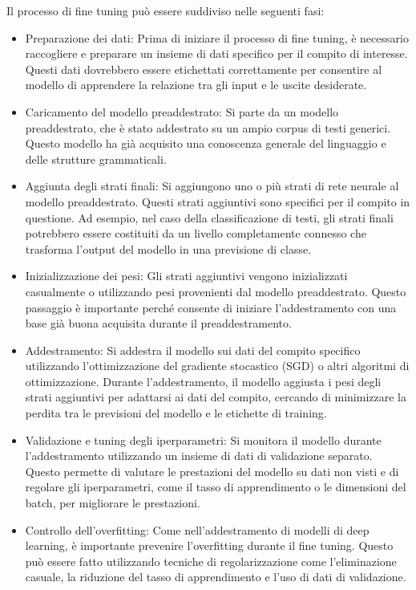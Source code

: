 Il processo di fine tuning può essere suddiviso nelle seguenti fasi:
\begin{itemize}
    \item Preparazione dei dati: Prima di iniziare il processo di fine tuning, è necessario raccogliere e preparare un insieme di dati specifico per il compito di interesse. Questi dati dovrebbero essere etichettati correttamente per consentire al modello di apprendere la relazione tra gli input e le uscite desiderate.
    \item Caricamento del modello preaddestrato: Si parte da un modello preaddestrato, che è stato addestrato su un ampio corpus di testi generici. Questo modello ha già acquisito una conoscenza generale del linguaggio e delle strutture grammaticali.
    \item Aggiunta degli strati finali: Si aggiungono uno o più strati di rete neurale al modello preaddestrato. Questi strati aggiuntivi sono specifici per il compito in questione. Ad esempio, nel caso della classificazione di testi, gli strati finali potrebbero essere costituiti da un livello completamente connesso che trasforma l'output del modello in una previsione di classe.
    \item Inizializzazione dei pesi: Gli strati aggiuntivi vengono inizializzati casualmente o utilizzando pesi provenienti dal modello preaddestrato. Questo passaggio è importante perché consente di iniziare l'addestramento con una base già buona acquisita durante il preaddestramento.
    \item Addestramento: Si addestra il modello sui dati del compito specifico utilizzando l'ottimizzazione del gradiente stocastico (SGD) o altri algoritmi di ottimizzazione. Durante l'addestramento, il modello aggiusta i pesi degli strati aggiuntivi per adattarsi ai dati del compito, cercando di minimizzare la perdita tra le previsioni del modello e le etichette di training.
    \item Validazione e tuning degli iperparametri: Si monitora il modello durante l'addestramento utilizzando un insieme di dati di validazione separato. Questo permette di valutare le prestazioni del modello su dati non visti e di regolare gli iperparametri, come il tasso di apprendimento o le dimensioni del batch, per migliorare le prestazioni.
    \item Controllo dell'overfitting: Come nell'addestramento di modelli di deep learning, è importante prevenire l'overfitting durante il fine tuning. Questo può essere fatto utilizzando tecniche di regolarizzazione come l'eliminazione casuale, la riduzione del tasso di apprendimento e l'uso di dati di validazione.

\end{itemize}
